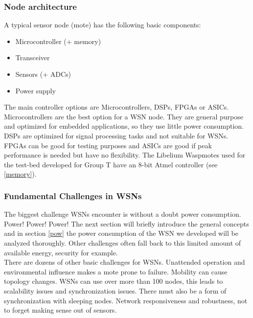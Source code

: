 \subsubsection{Node architecture}
A typical sensor node (mote) has the following basic components:
\begin{itemize}
\item Microcontroller (+ memory)
\item Transceiver
\item Sensors (+ ADCs)
\item Power supply
\end{itemize}
The main controller options are Microcontrollers, DSPs, FPGAs or ASICs. Microcontrollers are the best option for a WSN node. They are general purpose and optimized for embedded applications, so they use little power consumption. DSPs are optimized for signal processing tasks and not suitable for WSNs. FPGAs can be good for testing purposes and ASICs are good if peak performance is needed but have no flexibility. The Libelium Waspmotes used for the test-bed developed for Group T have an 8-bit Atmel controller (see \ref{memory}).
\subsubsection{Fundamental Challenges in WSNs}
The biggest challenge WSNs encounter is without a doubt power consumption. Power! Power! Power! The next section will briefly introduce the general concepts and in section \ref{pow} the power consumption of the WSN we developed will be analyzed thoroughly. Other challenges often fall back to this limited amount of available energy, security for example.\\
There are dozens of other basic challenges for WSNs. Unattended operation and environmental influence makes a mote prone to failure. Mobility can cause topology changes. WSNs can use over more than 100 nodes, this leads to scalability issues and synchronization issues. There must also be a form of synchronization with sleeping nodes. Network responsiveness and robustness, not to forget making sense out of sensors.

